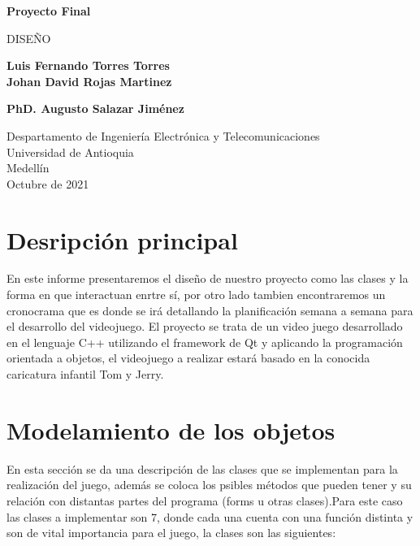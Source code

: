 \documentclass{article}
\begin{document}
\begin{titlepage}
    \begin{center}
        \vspace*{1cm}
            
        \Huge
        \textbf{Proyecto Final}
        
            
        \vspace{0.5cm}
        \LARGE
        DISEÑO
            
        \vspace{1.5cm}
            
        \textbf{Luis Fernando Torres Torres\\Johan David Rojas Martinez}
        
        \vspace{4cm}
            
        \textbf{PhD. Augusto Salazar Jiménez}
            
        \vfill
            
        \vspace{0.8cm}
            
        \Large
        Despartamento de Ingeniería Electrónica y Telecomunicaciones\\
        Universidad de Antioquia\\
        Medellín\\
        Octubre de 2021
            
    \end{center}
\end{titlepage}

\tableofcontents%
\newpage

\section{Desripción principal}\label{Descripcion}
\noindent
En este informe presentaremos el diseño de nuestro proyecto como las clases y la forma en que interactuan enrtre sí, por otro lado tambien encontraremos un cronocrama que es donde se irá detallando la planificación semana a semana para el desarrollo del videojuego. 
El proyecto se trata de un video juego desarrollado en el lenguaje C++ utilizando el framework de Qt y aplicando la programación orientada a objetos, el videojuego a realizar estará basado en la conocida caricatura infantil Tom y Jerry. 

\section{Modelamiento de los objetos} \label{ideas}
\noindent
En esta sección se da una descripción de las clases que se implementan para la realización del juego, además se coloca los psibles métodos que pueden tener y su relación con distantas partes del programa (forms u otras clases).Para este caso las clases a implementar son 7, donde cada una cuenta con una función distinta y son de vital importancia para el juego, la clases son las siguientes:\\
\end{document}
